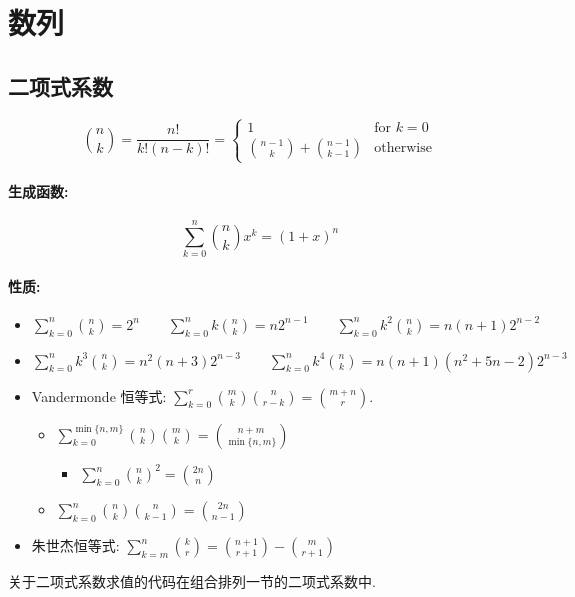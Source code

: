\clearpage
\section{数列}
\subsection{二项式系数}
\[\binom nk=\frac{n!}{k!(n-k)!}=\begin{cases}1&\text{for }k=0\\\displaystyle\binom {n-1}k+\binom{n-1}{k-1}&\text{otherwise}\end{cases}\]
\paragraph{生成函数:}
\[\sum_{k=0}^n\binom nkx^k=(1+x)^n\]
\paragraph{性质:}
\begin{itemize}
  \item $\displaystyle\sum_{k=0}^n\binom nk=2^n\qquad\sum_{k=0}^nk\binom nk=n2^{n-1}\qquad\sum_{k=0}^nk^2\binom nk=n(n+1)2^{n-2}$
  \item $\displaystyle\sum_{k=0}^nk^3\binom nk=n^2(n+3)2^{n-3}\qquad\sum_{k=0}^nk^4\binom nk=n(n+1)(n^2+5n-2)2^{n-3}$
  \item Vandermonde 恒等式: $\displaystyle\sum_{k=0}^r\binom mk\binom n{r-k}=\binom{m+n}r$.
    \begin{itemize}
      \item $\displaystyle\sum_{k=0}^{\min\{n,m\}}\binom nk\binom mk=\binom{n+m}{\min\{n,m\}}$
      \begin{itemize}
        \item $\displaystyle\sum_{k=0}^n\binom nk^2=\binom{2n}n$
      \end{itemize}
      \item $\displaystyle\sum_{k=0}^n\binom nk\binom n{k-1}=\binom{2n}{n-1}$
    \end{itemize}
  \item 朱世杰恒等式: $\displaystyle\sum_{k=m}^n\binom kr=\binom{n+1}{r+1}-\binom m{r+1}$
\end{itemize}

关于二项式系数求值的代码在组合排列一节的二项式系数中.

\clearpage
